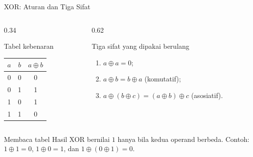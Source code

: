 \documentclass[aspectratio=169,11pt]{beamer}
\begin{document}
\begin{frame}{XOR: Aturan dan Tiga Sifat}
    \footnotesize
    \begin{columns}[T,onlytextwidth]
        \begin{column}{0.34\textwidth}
            \begin{block}{Tabel kebenaran}
                \centering
                \begin{tabular}{@{}ccc@{}}
                    \toprule
                    $a$ & $b$ & $a\oplus b$ \\
                    \midrule
                    0 & 0 & 0 \\
                    0 & 1 & 1 \\
                    1 & 0 & 1 \\
                    1 & 1 & 0 \\
                    \bottomrule
                \end{tabular}
            \end{block}
        \end{column}
        \begin{column}{0.62\textwidth}
            \begin{block}{Tiga sifat yang dipakai berulang}
                \begin{enumerate}
                    \item $a\oplus a=0$;
                    \item $a\oplus b=b\oplus a$ (komutatif);
                    \item $a\oplus(b\oplus c)=(a\oplus b)\oplus c$
                          (asosiatif).
                \end{enumerate}
            \end{block}
        \end{column}
    \end{columns}
    \vspace{0.15cm}
    \begin{exampleblock}{Membaca tabel}
        Hasil XOR bernilai $1$ hanya bila kedua operand berbeda. Contoh:
        $1\oplus1=0$, $1\oplus0=1$, dan $1\oplus(0\oplus1)=0$.
    \end{exampleblock}
\end{frame}
\end{document}
